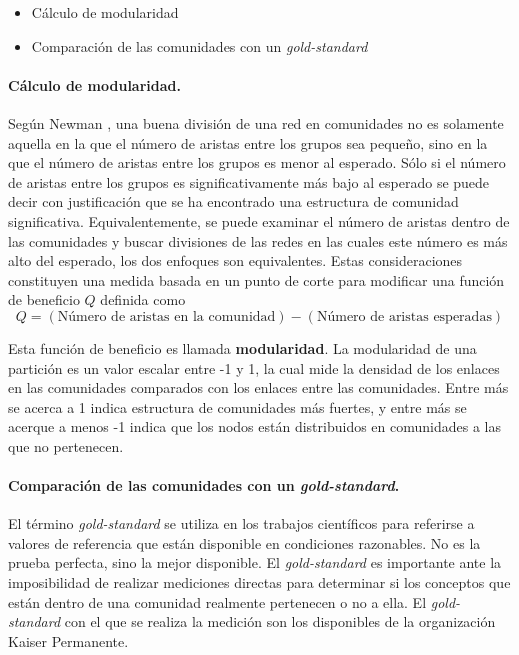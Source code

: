 \begin{itemize}
\item Cálculo de modularidad
\item Comparación de las comunidades con un \textit{gold-standard }
\end{itemize}

\paragraph{Cálculo de modularidad.}
 
Según Newman \cite{Newman2006FindingMatrices.}, una buena división de una red en comunidades no es solamente aquella en la que el número de aristas  entre los grupos sea pequeño, sino en la que el número de aristas entre los grupos es menor al esperado. Sólo si el número de aristas entre los grupos es significativamente más bajo al esperado se puede decir con justificación que se ha encontrado una estructura de comunidad significativa. Equivalentemente, se puede examinar el número de aristas dentro de las comunidades y buscar divisiones de las redes en las cuales este número es más alto del esperado, los dos enfoques son equivalentes. Estas consideraciones constituyen una medida basada en un punto de corte para modificar una función de beneficio $Q$ definida como
\begin{equation}
Q =  (\text{Número de aristas en la comunidad}) -  (\text{Número de aristas esperadas})
\end{equation} 

Esta función de beneficio es llamada \textbf{modularidad}. La modularidad de una partición es un valor escalar entre -1 y 1, la cual mide la densidad de los enlaces en las comunidades comparados con los enlaces entre las comunidades\cite{Blondel2008FastNetworks}. Entre más se acerca a 1 indica estructura de comunidades más fuertes, y entre más se acerque a menos -1 indica que los nodos están distribuidos en comunidades a las que no pertenecen\cite{Tang2010}.

\paragraph{Comparación de las comunidades con un \textit{gold-standard}.}

El término \textit{gold-standard} \cite{Versi1992quotGoldTerm.} se utiliza en los trabajos científicos para referirse a valores de referencia que están disponible en condiciones razonables. No es la prueba perfecta, sino la mejor disponible. El \textit{gold-standard} es importante ante la imposibilidad de realizar mediciones directas para determinar si los conceptos que están dentro de una comunidad realmente pertenecen o no a ella. El \textit{gold-standard} con el que se realiza la medición son los disponibles de la organización Kaiser Permanente.

